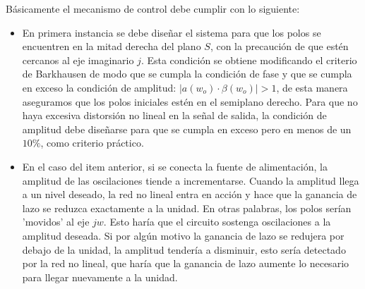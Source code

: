 Básicamente el mecanismo de control debe cumplir con lo siguiente: 
\begin{itemize}
    \item En primera instancia se debe diseñar el sistema para que los polos se encuentren en la mitad derecha del plano $S$, con la precaución de que estén cercanos al eje imaginario $j$. Esta condición se obtiene modificando el criterio de Barkhausen de modo que se cumpla la condición de fase y que se cumpla en exceso la condición de amplitud:  $\mid a(w_o)\cdot \beta(w_o)\mid > 1$, de
    esta manera aseguramos que los polos iniciales estén en el semiplano derecho. Para que no haya excesiva distorsión no lineal en la señal de salida, la condición de amplitud debe diseñarse
    para que se cumpla en exceso pero en menos de un $10 \%$, como criterio práctico.
    \item En el caso del item anterior, si se conecta la fuente de alimentación, la amplitud de las oscilaciones tiende a incrementarse. Cuando la amplitud llega a un nivel deseado, la red no lineal entra en acción y hace que la ganancia de lazo se reduzca exactamente a la unidad. En otras palabras, los polos serían 'movidos' al eje $j w$. Esto haría que el circuito sostenga oscilaciones a la amplitud deseada. Si por algún motivo la ganancia de lazo se redujera por debajo de la unidad, la amplitud tendería a disminuir, esto sería detectado por la red no lineal, que haría que la ganancia de lazo aumente lo necesario para llegar nuevamente a la unidad.

\end{itemize}



